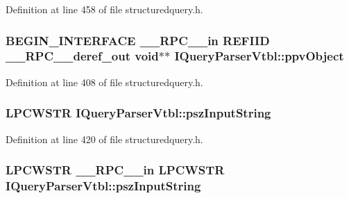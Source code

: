 Definition at line 458 of file structuredquery.\+h.

\subsubsection[{\texorpdfstring{ppv\+Object}{ppvObject}}]{\setlength{\rightskip}{0pt plus 5cm}B\+E\+G\+I\+N\+\_\+\+I\+N\+T\+E\+R\+F\+A\+CE {\bf \+\_\+\+\_\+\+R\+P\+C\+\_\+\+\_\+in} {\bf R\+E\+F\+I\+ID} {\bf \+\_\+\+\_\+\+R\+P\+C\+\_\+\+\_\+deref\+\_\+out} {\bf void}$\ast$$\ast$ I\+Query\+Parser\+Vtbl\+::ppv\+Object}\hypertarget{struct_i_query_parser_vtbl_a46c08c492ef827df69f894d73ac2fc4f}{}\label{struct_i_query_parser_vtbl_a46c08c492ef827df69f894d73ac2fc4f}


Definition at line 408 of file structuredquery.\+h.

\subsubsection[{\texorpdfstring{psz\+Input\+String}{pszInputString}}]{ {\bf L\+P\+C\+W\+S\+TR} I\+Query\+Parser\+Vtbl\+::psz\+Input\+String}\hypertarget{struct_i_query_parser_vtbl_aeb325457960fddf7cfde15840cdfe295}{}\label{struct_i_query_parser_vtbl_aeb325457960fddf7cfde15840cdfe295}


Definition at line 420 of file structuredquery.\+h.

\subsubsection[{\texorpdfstring{psz\+Input\+String}{pszInputString}}]{ {\bf L\+P\+C\+W\+S\+TR} {\bf \+\_\+\+\_\+\+R\+P\+C\+\_\+\+\_\+in} {\bf L\+P\+C\+W\+S\+TR} I\+Query\+Parser\+Vtbl\+::psz\+Input\+String}\hypertarget{struct_i_query_parser_vtbl_ae998f54b769d6b08a71d2e1a5807ccf2}{}\label{struct_i_query_parser_vtbl_ae998f54b769d6b08a71d2e1a5807ccf2}


